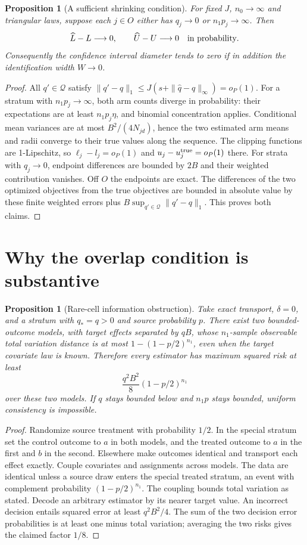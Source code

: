 \documentclass[11pt]{article}
\newtheorem{proposition}[theorem]{Proposition}
\theoremstyle{remark}\newtheorem{remark}[theorem]{Remark}
\begin{document}
\begin{proposition}[A sufficient shrinking condition]\label{shrink}
For fixed $J$, $n_0\to\infty$ and triangular laws, suppose each $j\in O$ either has $q_j\to0$ or $n_1p_j\to\infty$. Then
\[
 \widehat L-L\longrightarrow0,\qquad
 \widehat U-U\longrightarrow0
 \quad\hbox{in probability}.
\]
Consequently the confidence interval diameter tends to zero if in addition the identification width $W\to0$.
\end{proposition}
\begin{proof}
All $q'\in\mathcal Q$ satisfy
$\|q'-q\|_1\leq J(s+\|\widehat q-q\|_\infty)=o_P(1)$.
For a stratum with $n_1p_j\to\infty$, both arm counts diverge in probability: their expectations are at least $n_1p_j\eta$, and binomial concentration applies. Conditional mean variances are at most $B^2/(4N_{jd})$, hence the two estimated arm means and radii converge to their true values along the sequence. The clipping functions are 1-Lipschitz, so $\ell_j-l_j=o_P(1)$ and $u_j-u_j^{\rm true}=o_P(1)$ there. For strata with $q_j\to0$, endpoint differences are bounded by $2B$ and their weighted contribution vanishes. Off $O$ the endpoints are exact. The differences of the two optimized objectives from the true objectives are bounded in absolute value by these finite weighted errors plus $B\sup_{q'\in\mathcal Q}\|q'-q\|_1$. This proves both claims.
\end{proof}

\section{Why the overlap condition is substantive}
\begin{proposition}[Rare-cell information obstruction]\label{rare}
Take exact transport, $\delta=0$, and a stratum with $q_*=q>0$ and source probability $p$. There exist two bounded-outcome models, with target effects separated by $qB$, whose $n_1$-sample observable total variation distance is at most
$1-(1-p/2)^{n_1}$, even when the target covariate law is known. Therefore every estimator has maximum squared risk at least
\[
 \frac{q^2B^2}{8}(1-p/2)^{n_1}
\]
over these two models. If $q$ stays bounded below and $n_1p$ stays bounded, uniform consistency is impossible.
\end{proposition}
\begin{proof}
Randomize source treatment with probability $1/2$. In the special stratum set the control outcome to $a$ in both models, and the treated outcome to $a$ in the first and $b$ in the second. Elsewhere make outcomes identical and transport each effect exactly. Couple covariates and assignments across models. The data are identical unless a source draw enters the special treated stratum, an event with complement probability $(1-p/2)^{n_1}$. The coupling bounds total variation as stated. Decode an arbitrary estimator by its nearer target value. An incorrect decision entails squared error at least $q^2B^2/4$. The sum of the two decision error probabilities is at least one minus total variation; averaging the two risks gives the claimed factor $1/8$.
\end{proof}
\end{document}
